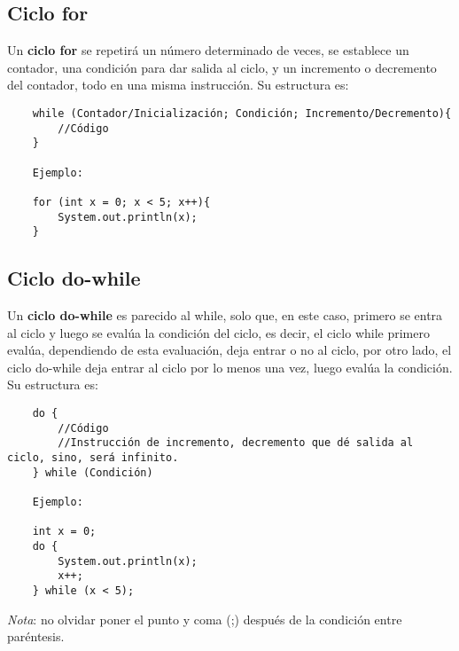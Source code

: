 \subsection{Ciclo for}
Un \textbf{ciclo for} se repetirá un número determinado de veces, se establece un contador, una condición para dar salida al ciclo, y un incremento o decremento del contador, todo en una misma instrucción. Su estructura es:
\begin{lstlisting}
    while (Contador/Inicialización; Condición; Incremento/Decremento){
        //Código
    }
    
    Ejemplo:
    
    for (int x = 0; x < 5; x++){
        System.out.println(x);
    }
\end{lstlisting}

\subsection{Ciclo do-while}
Un \textbf{ciclo do-while} es parecido al while, solo que, en este caso, primero se entra al ciclo y luego se evalúa la condición del ciclo, es decir, el ciclo while primero evalúa, dependiendo de esta evaluación, deja entrar o no al ciclo, por otro lado, el ciclo do-while deja entrar al ciclo por lo menos una vez, luego evalúa la condición. Su estructura es:
\begin{lstlisting}
    do {
        //Código
        //Instrucción de incremento, decremento que dé salida al ciclo, sino, será infinito.
    } while (Condición)
    
    Ejemplo:
    
    int x = 0;
    do {
        System.out.println(x);
        x++;
    } while (x < 5);
\end{lstlisting}
\textit{Nota}: no olvidar poner el punto y coma (;) después de la condición entre paréntesis.

